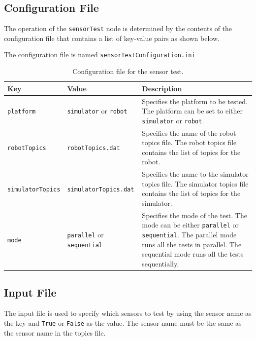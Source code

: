\documentclass{CSSRforAfrica}
\begin{document}
\subsection*{Configuration File}
The operation of the \texttt{sensorTest} node is determined by the contents of the configuration file that contains a list of key-value pairs as shown below. 

The configuration file is named \texttt{sensorTestConfiguration.ini}

\begin{longtable}[c]{|l|l|p{7cm}|}
	\caption{Configuration file for the sensor test.} \label{tab:config_file}\\
	\hline
	\rowcolor{gray!30}
	\small{\textbf{Key}} & \small{\textbf{Value}} & \small{\textbf{Description}} \\ \hline
	\endhead %
	
	\small{\texttt{platform}} & \small{\texttt{simulator}} or \texttt{robot} & \small{Specifies the platform to be tested. The platform can be set to either \texttt{simulator} or \texttt{robot}.} \\ \hline
	\small{\texttt{robotTopics}} & \small{\texttt{robotTopics.dat}} & \small{Specifies the name of the robot topics file. The robot topics file contains the list of topics for the robot.} \\ \hline
	\small{\texttt{simulatorTopics}} & \small{\texttt{simulatorTopics.dat}} & \small{Specifies the name to the simulator topics file. The simulator topics file contains the list of topics for the simulator.} \\ \hline
	\small{\texttt{mode}} & \small{\texttt{parallel}} or \texttt{sequential} & \small{Specifies the mode of the test. The mode can be either \texttt{parallel} or \texttt{sequential}. The parallel mode runs all the tests in parallel. The sequential mode runs all the tests sequentially.} \\ \hline
	
\end{longtable}

\subsection*{Input File}
The input file is used to specify which sensors to test by using the sensor name as the key and \texttt{True} or \texttt{False} as the value. 
The sensor name must be the same as the sensor name in the topics file. 
\end{document}
